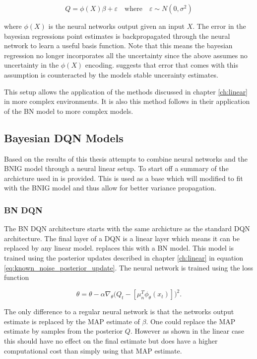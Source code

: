 \begin{equation*}
	Q = \phi(X)\beta + \varepsilon \quad \text{where} \quad \varepsilon \sim N(0,\sigma^2)
\end{equation*}

where $\phi(X)$ is the neural networks output given an input $X$. The error in the bayesian regressions point estimates is backpropagated through the neural network to learn a useful basis function. Note that this means the bayesian regression no longer incorporates all the uncertainty since the above assumes no uncertainty in the $\phi(X)$ encoding. \cite{carlos_2018} suggests that error that comes with this assumption is counteracted by the models stable uncerainty estimates.

This setup allows the application of the methods discussed in chapter \ref{ch:linear} in more complex environments. It is also this method \cite{azziz_2018} follows in their application of the BN model to more complex models.

\subsection{Bayesian DQN Models}

Based on the results of \cite{carlos_2018} this thesis attempts to combine neural networks and the BNIG model through a neural linear setup. To start off a summary of the archicture used in \cite{azziz_2018} is provided. This is used as a base which will modified to fit with the BNIG model and thus allow for better variance propagation.

\subsubsection{BN DQN}

The BN DQN architecture starts with the same archicture as the standard DQN architecture\citep{mnih_2015}. The final layer of a DQN is a linear layer which means it can be replaced by any linear model. \cite{azziz_2018} replaces this with a BN model. This model is trained using the posterior updates described in chapter \ref{ch:linear} in equation \ref{eq:known_noise_posterior_update}. The neural network is trained using the loss function

\begin{equation*}
	\theta = \theta - \alpha\nabla_\theta\big(Q_t - [\mu_n^T\phi_\theta(x_t)]\big)^2.
\end{equation*}

The only difference to a regular neural network is that the networks output estimate is replaced by the MAP estimate of $\beta$. One could replace the MAP estimate by samples from the posterior $Q$. However as shown in the linear case this should have no effect on the final estimate but does have a higher computational cost than simply using that MAP estimate.

